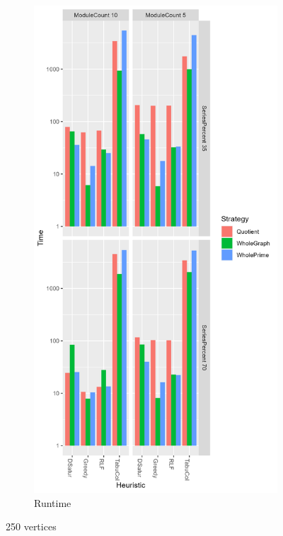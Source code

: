 \documentclass[a4paper]{article}
\begin{document}
\begin{figure}
\begin{subfigure}{.5\paperwidth}
    \end{subfigure}%
    \begin{subfigure}{.5\paperwidth}
        \includegraphics[width=\columnwidth]{Tables/250Time.png}
      \caption{Runtime}
      \label{fig:250t}
    \end{subfigure}
\caption{250 vertices}
\label{fig:250}
\end{figure}
\end{document}
